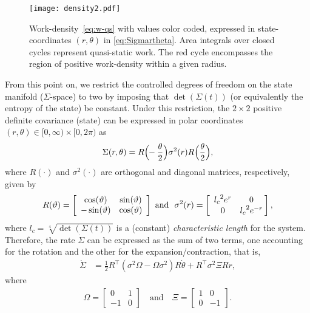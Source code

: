 \documentclass[
 reprint,
superscriptaddress,
 amsmath,amssymb,prl
 aps
]{revtex4-2}
\newcommand{\lam}{{l_c}}
\begin{document}
 \begin{figure}[t]     \texttt{[image: density2.pdf]}
        \caption{
        Work-density~\eqref{eq:w-qs} with values color coded, expressed in state-coordinates $(r,\theta)$ in \eqref{eq:Sigmartheta}. Area integrals over closed cycles represent quasi-static work. The red cycle encompasses the region of positive work-density within a given radius.}
        \label{fig:density}
\end{figure}


From this point on, we restrict the controlled degrees of freedom on the state manifold ($\Sigma$-space) to two by imposing that $\det(\Sigma(t))$ (or equivalently the entropy of the state) be constant. Under this restriction, the $2\times 2$ positive definite covariance (state) can be expressed in polar coordinates $(r,\theta)\in [0,\infty)\times [0,2\pi)$ as
\begin{equation}\label{eq:Sigmartheta}
    \Sigma(r,\theta)=R\Big(\hspace{-3pt}-\frac{\theta}{2}\Big)\sigma^2(r)R\Big(\frac{\theta}{2}\Big),
\end{equation}
where $R(\cdot)$ and $\sigma^2(\cdot)$ are orthogonal and diagonal matrices, respectively, given by
\begin{equation*}
    R(\vartheta)=\left[\begin{array}{cc}\cos(\vartheta)&\sin(\vartheta)\\-\sin(\vartheta)&\cos(\vartheta)\end{array}\right]~\mbox{and}~~
   \sigma^2(r) =\left[\begin{array}{cc}\lam^2e^r&0\\0&\lam^2e^{-r}\end{array}\hspace{-3pt}\right],
\end{equation*}
where $\lam=\sqrt[4]{\det(\Sigma(t))}$\label{page:charlength} is a (constant) {\em characteristic length} for the system. Therefore, the rate $\dot{\Sigma}$ can be expressed as the sum of two terms, one accounting for the rotation and the other for the expansion/contraction, that is,
\begin{align*}
    \dot{\Sigma} &= \frac{1}{2}R^\top(\sigma^2\Omega - \Omega \sigma^2)R \dot{\theta} +  R^\top\sigma^2\Xi R\dot{r},
\end{align*}
where
\begin{align*}
    \Omega=\begin{bmatrix}
    0 & 1 \\ -1 & 0
    \end{bmatrix}\quad\mbox{and}\quad 
    \Xi=\begin{bmatrix}
    1 & 0 \\ 0 & -1
    \end{bmatrix}.
\end{align*}
\end{document}

